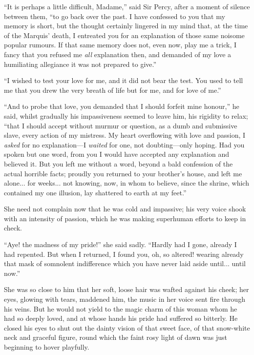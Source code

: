 \enquote{It is perhaps a little difficult, Madame,} said Sir Percy, after a moment of silence between them, \enquote{to go back over the past. I have confessed to you that my memory is short, but the thought certainly lingered in my mind that, at the time of the Marquis’ death, I entreated you for an explanation of those same noisome popular rumours. If that same memory does not, even now, play me a trick, I fancy that you refused me \textit{all} explanation then, and demanded of my love a humiliating allegiance it was not prepared to give.}

\enquote{I wished to test your love for me, and it did not bear the test. You used to tell me that you drew the very breath of life but for me, and for love of me.}

\enquote{And to probe that love, you demanded that I should forfeit mine honour,} he said, whilst gradually his impassiveness seemed to leave him, his rigidity to relax; \enquote{that I should accept without murmur or question, as a dumb and submissive slave, every action of my mistress. My heart overflowing with love and passion, I \textit{asked} for no explanation---I \textit{waited} for one, not doubting---only hoping. Had you spoken but one word, from you I would have accepted any explanation and believed it. But you left me without a word, beyond a bald confession of the actual horrible facts; proudly you returned to your brother's house, and left me alone... for weeks... not knowing, now, in whom to believe, since the shrine, which contained my one illusion, lay shattered to earth at my feet.}

She need not complain now that he was cold and impassive; his very voice shook with an intensity of passion, which he was making superhuman efforts to keep in check.

\enquote{Aye! the madness of my pride!} she said sadly. \enquote{Hardly had I gone, already I had repented. But when I returned, I found you, oh, so altered! wearing already that mask of somnolent indifference which you have never laid aside until... until now.}

She was so close to him that her soft, loose hair was wafted against his cheek; her eyes, glowing with tears, maddened him, the music in her voice sent fire through his veins. But he would not yield to the magic charm of this woman whom he had so deeply loved, and at whose hands his pride had suffered so bitterly. He closed his eyes to shut out the dainty vision of that sweet face, of that snow-white neck and graceful figure, round which the faint rosy light of dawn was just beginning to hover playfully.

